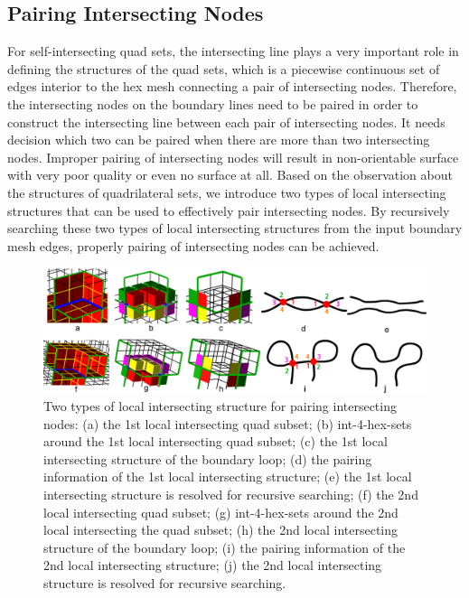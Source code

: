 \documentclass[final,5p,times,twocolumn]{elsarticle}
\begin{document}
\subsection{Pairing Intersecting Nodes}
\label{sec:int_pt_pair}
For self-intersecting quad sets, the intersecting line plays a very important role in defining the structures of the quad sets, which is a piecewise continuous set of edges interior to the hex mesh connecting a pair of intersecting nodes. Therefore, the intersecting nodes on the boundary lines need to be paired in order to construct the intersecting line between each pair of intersecting nodes. It needs decision which two can be paired when there are more than two intersecting nodes. Improper pairing of intersecting nodes will result in non-orientable surface with very poor quality or even no surface at all\cite{Suzuki:2010hn}. Based on the observation about the structures of quadrilateral sets, we introduce two types of local intersecting structures that can be used to effectively pair intersecting nodes. By recursively searching these two types of local intersecting structures from the input boundary mesh edges, properly pairing of intersecting nodes can be achieved.

\begin{figure}[htbp]
\begin{center}
\includegraphics[width=17cm]{pair_patterns.png}
\caption{Two types of local intersecting structure for pairing intersecting nodes: (a) the 1st local intersecting quad subset; (b) int-4-hex-sets around the 1st local intersecting quad subset; (c) the 1st local intersecting structure of the boundary loop; (d) the pairing information of the 1st local intersecting structure; (e) the 1st local intersecting structure is resolved for recursive searching; (f) the 2nd local intersecting quad subset; (g) int-4-hex-sets around the 2nd local intersecting the quad subset; (h) the 2nd local intersecting structure of the boundary loop; (i) the pairing information of the 2nd local intersecting structure; (j) the 2nd local intersecting structure is resolved for recursive searching.}
\label{fig:int_pair_tpl}
\end{center}
\end{figure}
\end{document}
